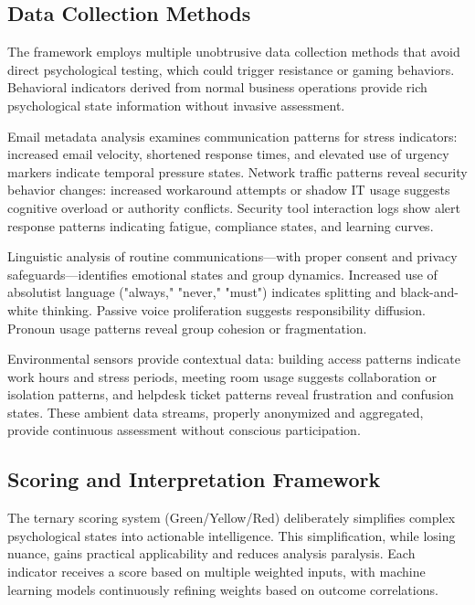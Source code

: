 \documentclass[manuscript,screen,review]{acmart}
\begin{document}
\subsection{Data Collection Methods}

The framework employs multiple unobtrusive data collection methods that avoid direct psychological testing, which could trigger resistance or gaming behaviors. Behavioral indicators derived from normal business operations provide rich psychological state information without invasive assessment.

Email metadata analysis examines communication patterns for stress indicators: increased email velocity, shortened response times, and elevated use of urgency markers indicate temporal pressure states. Network traffic patterns reveal security behavior changes: increased workaround attempts or shadow IT usage suggests cognitive overload or authority conflicts. Security tool interaction logs show alert response patterns indicating fatigue, compliance states, and learning curves.

Linguistic analysis of routine communications—with proper consent and privacy safeguards—identifies emotional states and group dynamics. Increased use of absolutist language ("always," "never," "must") indicates splitting and black-and-white thinking. Passive voice proliferation suggests responsibility diffusion. Pronoun usage patterns reveal group cohesion or fragmentation.

Environmental sensors provide contextual data: building access patterns indicate work hours and stress periods, meeting room usage suggests collaboration or isolation patterns, and helpdesk ticket patterns reveal frustration and confusion states. These ambient data streams, properly anonymized and aggregated, provide continuous assessment without conscious participation.

\subsection{Scoring and Interpretation Framework}

The ternary scoring system (Green/Yellow/Red) deliberately simplifies complex psychological states into actionable intelligence. This simplification, while losing nuance, gains practical applicability and reduces analysis paralysis. Each indicator receives a score based on multiple weighted inputs, with machine learning models continuously refining weights based on outcome correlations.
\end{document}
